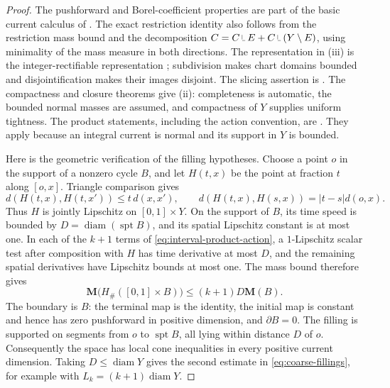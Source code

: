 \documentclass[11pt]{article}
\numberwithin{equation}{section}
\theoremstyle{definition}
\theoremstyle{remark}
\begin{document}
\begin{proof}
The pushforward and Borel-coefficient properties are part of the basic
current calculus of \cite{AK2000}. The exact restriction identity also
follows from the restriction mass bound and the decomposition
\(C=C\mathbin{\vrule height 1.4ex depth -0.3ex width .07ex\vrule height .07ex depth 0ex width .7ex} E+C\mathbin{\vrule height 1.4ex depth -0.3ex width .07ex\vrule height .07ex depth 0ex width .7ex}(Y\setminus E)\), using minimality of the mass
measure in both directions. The representation in (iii) is the
integer-rectifiable representation
\cite[Lemma~4.1 and Theorem~4.5]{AK2000}; subdivision makes chart domains
bounded and disjointification makes their images disjoint. The slicing
assertion is \cite[Theorems~5.6--5.7]{AK2000}. The compactness and closure
theorems \cite[Theorems~5.2 and~8.5]{AK2000} give (ii): completeness is
automatic, the bounded normal masses are assumed, and compactness of
\(Y\) supplies uniform tightness. The product statements, including the
action convention, are
\cite[Definition~3.1 and Theorem~3.2]{Wenger2007Flat}. They apply because
an integral current is normal and its support in \(Y\) is bounded.

Here is the geometric verification of the filling hypotheses. Choose a
point \(o\) in the support of a nonzero cycle \(B\), and let
\(H(t,x)\) be the point at fraction \(t\) along \([o,x]\).
Triangle comparison gives
\[
 d(H(t,x),H(t,x'))\le t\,d(x,x'),\qquad
 d(H(t,x),H(s,x))=|t-s|d(o,x).
\]
Thus \(H\) is jointly Lipschitz on \([0,1]\times Y\).
On the support of \(B\), its time speed is bounded by
\(D=\operatorname{diam}(\operatorname{spt} B)\), and its spatial Lipschitz constant is at most one.
In each of the \(k+1\) terms of \eqref{eq:interval-product-action}, a
\(1\)-Lipschitz scalar test after composition with \(H\) has time
derivative at most \(D\), and the remaining spatial derivatives have
Lipschitz bounds at most one. The mass bound therefore gives
\begin{equation}
\label{eq:cone-mass-bound}
 \mathbf M\bigl(H_\#([0,1]\times B)\bigr)
 \le (k+1)D\mathbf M(B).
\end{equation}
The boundary is \(B\): the terminal map is the identity, the initial
map is constant and hence has zero pushforward in positive dimension,
and \(\partial B=0\). The filling is supported on segments from \(o\)
to \(\operatorname{spt} B\), all lying within distance \(D\) of \(o\).
Consequently the space has local cone inequalities in every positive
current dimension. Taking \(D\le\operatorname{diam} Y\) gives the second estimate
in \eqref{eq:coarse-fillings}, for example with
\(L_k=(k+1)\operatorname{diam} Y\).


\end{proof}
\end{document}
